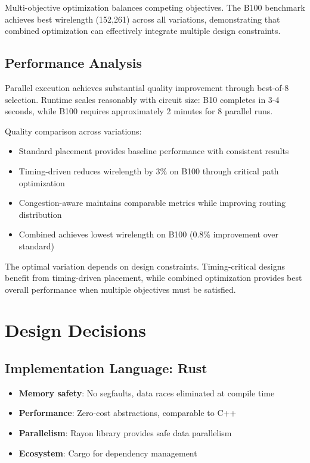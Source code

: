 \documentclass[11pt]{article}
\begin{document}
Multi-objective optimization balances competing objectives. The B100 benchmark achieves best wirelength (152,261) across all variations, demonstrating that combined optimization can effectively integrate multiple design constraints.

\subsection{Performance Analysis}

Parallel execution achieves substantial quality improvement through best-of-8 selection. Runtime scales reasonably with circuit size: B10 completes in 3-4 seconds, while B100 requires approximately 2 minutes for 8 parallel runs.

Quality comparison across variations:
\begin{itemize}
    \item Standard placement provides baseline performance with consistent results
    \item Timing-driven reduces wirelength by 3\% on B100 through critical path optimization
    \item Congestion-aware maintains comparable metrics while improving routing distribution
    \item Combined achieves lowest wirelength on B100 (0.8\% improvement over standard)
\end{itemize}

The optimal variation depends on design constraints. Timing-critical designs benefit from timing-driven placement, while combined optimization provides best overall performance when multiple objectives must be satisfied.

\section{Design Decisions}

\subsection{Implementation Language: Rust}

\begin{itemize}
    \item \textbf{Memory safety}: No segfaults, data races eliminated at compile time
    \item \textbf{Performance}: Zero-cost abstractions, comparable to C++
    \item \textbf{Parallelism}: Rayon library provides safe data parallelism
    \item \textbf{Ecosystem}: Cargo for dependency management
\end{itemize}
\end{document}
